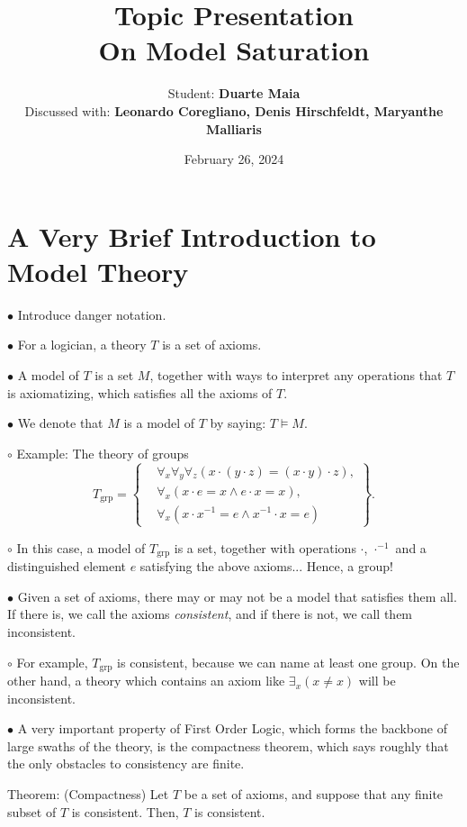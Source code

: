 \documentclass{article}
\title{Topic Presentation\\On Model Saturation}
\author{Student: \textbf{Duarte Maia}\\[1ex]Discussed with: \textbf{Leonardo Coregliano, Denis Hirschfeldt, Maryanthe Malliaris}}
\date{February 26, 2024}
\newcommand\Point[1]{\noindent \hspace{\labelsep} {\large $\bullet$ #1} \smallskip}
\newcommand\point[1]{\noindent \hspace{\labelsep} {\small $\circ$ #1} \smallskip}
\begin{document}
\maketitle

\section{A Very Brief Introduction to Model Theory}

\Point{Introduce danger notation.}

\Point{For a logician, a theory $T$ is a set of axioms.}

\Point{A model of $T$ is a set $M$, together with ways to interpret any operations that $T$ is axiomatizing, which satisfies all the axioms of $T$.}

\Point{We denote that $M$ is a model of $T$ by saying: $T \vDash M$.}

\point{Example: The theory of groups
\begin{equation}
T_{\text{grp}} = \left\{
\begin{aligned}
&\forall_x \forall_y \forall_z (x \cdot (y \cdot z) = (x \cdot y) \cdot z),\\
&\forall_x (x \cdot e = x \land e \cdot x = x),\\
&\forall_x (x \cdot x^{-1} = e \land x^{-1} \cdot x = e)
\end{aligned}\right\}.
\end{equation}}

\point{In this case, a model of $T_{\text{grp}}$ is a set, together with operations $\cdot$, $\cdot^{-1}$ and a distinguished element $e$ satisfying the above axioms... Hence, a group!}

\Point{Given a set of axioms, there may or may not be a model that satisfies them all. If there is, we call the axioms \emph{consistent}, and if there is not, we call them inconsistent.}

\point{For example, $T_{\text{grp}}$ is consistent, because we can name at least one group. On the other hand, a theory which contains an axiom like $\exists_x (x \neq x)$ will be inconsistent.}

\Point{A very important property of First Order Logic, which forms the backbone of large swaths of the theory, is the compactness theorem, which says roughly that the only obstacles to consistency are finite.

Theorem: (Compactness) Let $T$ be a set of axioms, and suppose that any finite subset of $T$ is consistent. Then, $T$ is consistent.}
\end{document}
